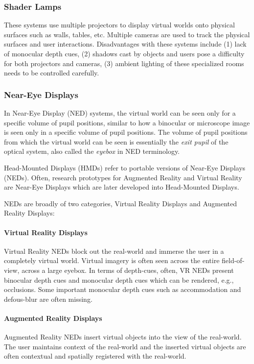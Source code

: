 \subsubsection{Shader Lamps}
These systems use multiple projectors to display virtual worlds onto physical surfaces such as walls, tables, etc. 
Multiple cameras are used to track the physical surfaces and user interactions.
Disadvantages with these systems include (1) lack of monocular depth cues, (2) shadows cast by objects and users pose a difficulty for both projectors and cameras, (3) ambient lighting of these specialized rooms needs to be controlled carefully.


\subsubsection{Near-Eye Displays}
In Near-Eye Display (NED) systems, the virtual world can be seen only for a specific volume of pupil positions, similar to how a binocular or microscope image is seen only in a specific volume of pupil positions. 
The volume of pupil positions from which the virtual world can be seen is essentially the \emph{exit pupil} of the optical system, also called the \emph{eyebox} in NED terminology.

Head-Mounted Displays (HMDs) refer to portable versions of Near-Eye Displays (NEDs). 
Often, research prototypes for Augmented Reality and Virtual Reality are Near-Eye Displays which are later developed into Head-Mounted Displays.

NEDs are broadly of two categories, Virtual Reality Displays and Augmented Reality Displays:

\paragraph{Virtual Reality Displays}
Virtual Reality NEDs block out the real-world and immerse the user in a completely virtual world. 
Virtual imagery is often seen across the entire field-of-view, across a large eyebox. 
In terms of depth-cues, often, VR NEDs present binocular depth cues and monocular depth cues which can be rendered, e.g., occlusions. 
Some important monocular depth cues such as accommodation and defous-blur are often missing.

\paragraph{Augmented Reality Displays}
Augmented Reality NEDs insert virtual objects into the view of the real-world.
The user maintains context of the real-world and the inserted virtual objects are often contextual and spatially registered with the real-world.

